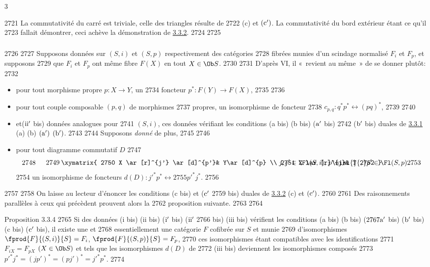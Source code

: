 3	\documentclass[10pt]{../fichiers-configuration-latex/smfart}
\begin{document}
  2721	La commutativité du carré est triviale, celle des triangles résulte de
  2722	(c) et ${\rm(c')}$. La commutativité du bord extérieur étant ce qu'il
  2723	fallait démontrer, ceci achève la démonstration de \hyperref[XVII.prop3.3.2]{3.3.2}.
  2724	
  2725	\subsubsection{}
  2726	
  2727	Supposons données sur $(S,i)$ et $(S,p)$ respectivement des catégories
  2728	fibrées munies d'un scindage normalisé $F_i$ et $F_p$, et supposons
  2729	que $F_i$ et $F_p$ ont même fibre $F(X)$ en tout $X\in \Ob S$.
  2730	
  2731	D'après  VI, il « revient au même »  de se donner plutôt:
  2732	\begin{itemize}
  2733	\item[(i bis)] pour tout morphisme propre $p:X\rightarrow Y$, un
  2734	foncteur $p^{\ast}:F(Y)\rightarrow F(X)$,
  2735	
  2736	\item[(ii bis)] pour tout couple composable $(p,q)$ de morphismes
  2737	propres, un isomorphisme de foncteur
  2738	$c_{p,q}:q^{\ast}p^{\ast}\leftrightarrow (pq)^{\ast}$,
  2739	
  2740	\item[(${\rm i'}$ bis)] et\pageoriginale (${\rm ii'}$ bis) données analogues pour
  2741	$(S,i)$, ces données vérifiant les conditions (a bis) (b bis) (${\rm a'}$ bis)
  2742	(${\rm b'}$ bis) duales de \hyperref[XVII.subsubsec3.3.1]{3.3.1} (a) (b) ${\rm (a')}$ ${\rm (b')}$.
  2743	
  2744	Supposons \emph{donné} de plus,
  2745	
  2746	\item[(iii bis)] pour tout diagramme commutatif $D$
  2747	\[
  2748	\vcenter{
  2749	\xymatrix{
  2750	X \ar[r]^{j'} \ar[d]^{p'}&  Y\ar[d]^{p} \\
  2751	Z \ar[r]^{j}& T
  2752	}}\quad j,j' \in \Fl(S,i)\text{; }p\sisi{}{,} p' \in \Fl(S,p)
  2753	\]
  2754	un isomorphisme de foncteurs $d(D):{j'}^{\ast}p^{\ast}\leftrightarrow
  2755	{p'}^{\ast}j^{\ast}$.
  2756	\end{itemize}
  2757	
  2758	On laisse au lecteur d'énoncer les conditions (c bis) et (${\rm c'}$
  2759	bis) duales de \hyperref[XVII.prop3.3.2]{3.3.2} (c) et ${\rm (c')}$.
  2760	
  2761	Des raisonnements parallèles à ceux qui précèdent prouvent alors la
  2762	proposition suivante.
  2763	
  2764	\begin{enonce*}{Proposition 3.3.4}
  2765	Si des données {\rm (i bis) (ii bis) (${\rm i'}$ bis) (${\rm ii'}$
  2766	bis) (iii bis)} vérifient les conditions {\rm (a bis) (b bis) (${\rm
  2767	a'}$ bis) (${\rm b'}$ bis) (c bis) (${\rm c'}$ bis)}, il existe une et
  2768	essentiellement une catégorie $F$ cofibrée sur $S$ et munie
  2769	d'isomorphismes $\fprod{F}{(S,i)}{S}=F_i$, $\fprod{F}{(S,p)}{S}=F_p$,
  2770	ces isomorphismes étant compatibles avec les identifications
  2771	$F_{iX}=F_{pX}$ $(X\in \Ob S)$ et tels que les isomorphismes $d(D)$ de
  2772	{\rm (iii bis)} deviennent les isomorphismes composés
  2773	${p'}^{\ast}j^{\ast}=(jp')^{\ast}=(pj')^{\ast}={j'}^{\ast}p^{\ast}$.
  2774	\end{enonce*}
\end{document}
